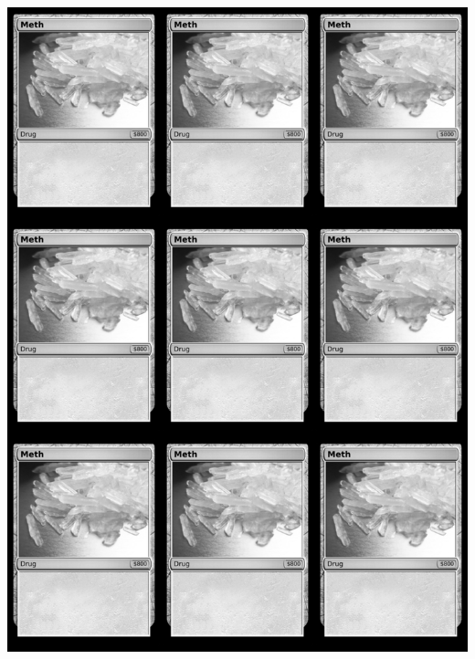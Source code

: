 \documentclass[a4paper]{article}
\begin{document}
\begin{center}
	\centering
	\includegraphics[width=190.5mm,height=266.7mm]{output/temp/page4.png}
\end{center}

\newpage
\end{document}
